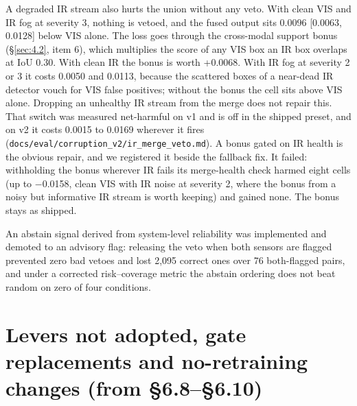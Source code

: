 \documentclass[10pt]{article}
\begin{document}
A degraded IR stream also hurts the union without any veto. With clean VIS and IR fog at severity 3, nothing is vetoed, and the fused output sits 0.0096 [0.0063, 0.0128] below VIS alone. The loss goes through the cross-modal support bonus (\S\ref{sec:4.2}, item 6), which multiplies the score of any VIS box an IR box overlaps at IoU 0.30. With clean IR the bonus is worth +0.0068. With IR fog at severity 2 or 3 it costs 0.0050 and 0.0113, because the scattered boxes of a near-dead IR detector vouch for VIS false positives; without the bonus the cell sits above VIS alone. Dropping an unhealthy IR stream from the merge does not repair this. That switch was measured net-harmful on v1 and is off in the shipped preset, and on v2 it costs 0.0015 to 0.0169 wherever it fires (\texttt{docs/\allowbreak{}eval/\allowbreak{}corruption\_\allowbreak{}v2/\allowbreak{}ir\_\allowbreak{}merge\_\allowbreak{}veto.md}). A bonus gated on IR health is the obvious repair, and we registered it beside the fallback fix. It failed: withholding the bonus wherever IR fails its merge-health check harmed eight cells (up to $-$0.0158, clean VIS with IR noise at severity 2, where the bonus from a noisy but informative IR stream is worth keeping) and gained none. The bonus stays as shipped.

An abstain signal derived from system-level reliability was implemented and demoted to an advisory flag: releasing the veto when both sensors are flagged prevented zero bad vetoes and lost 2,095 correct ones over 76 both-flagged pairs, and under a corrected risk--coverage metric the abstain ordering does not beat random on zero of four conditions.

\FloatBarrier
\section{Levers not adopted, gate replacements and no-retraining changes (from \S6.8--\S6.10)}\label{app:J}
\end{document}
